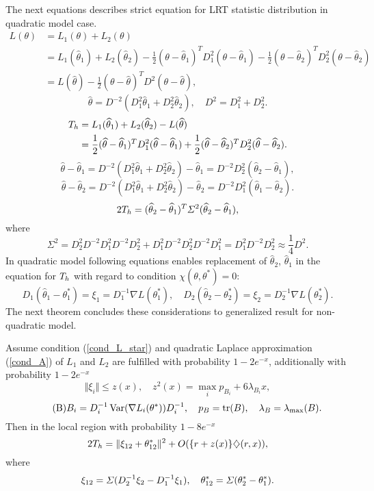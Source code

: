 The next equations describes strict equation for LRT statistic distribution in  quadratic model case. 
\begin{align*}
L(\theta) &= L_1(\theta) + L_2(\theta) \\
&=  
L_1(\widehat{\theta}_1) + L_2(\widehat{\theta}_2) -  \frac{1}{2} (\theta - \widehat{\theta}_1)^T D_1^2  (\theta - \widehat{\theta}_1)
- 
\frac{1}{2} (\theta - \widehat{\theta}_2)^T D_2^2  (\theta - \widehat{\theta}_2)  \\
 &=
 L(\widehat{\theta}) - \frac{1}{2} (\theta - \widehat{\theta})^T D^2  (\theta - \widehat{\theta}),
\end{align*}
\[
\widehat{\theta} = D^{-2} (D_1^2 \widehat{\theta}_1 + D_2^2 \widehat{\theta}_2 ),
\quad D^2 = D_1^2 + D_2^2.
\]    
\begin{align*}
T_h &=
L_1(\widehat{\theta}_1) + L_2(\widehat{\theta}_2) -  L(\widehat{\theta}) \\
&=   \frac{1}{2} (\widehat{\theta} - \widehat{\theta}_1)^T D_1^2  (\widehat{\theta} - \widehat{\theta}_1)
+ \frac{1}{2} (\widehat{\theta} - \widehat{\theta}_2)^T D_2^2  (\widehat{\theta} - \widehat{\theta}_2).
\end{align*}
\[
\widehat{\theta} - \widehat{\theta}_1 = D^{-2} (D_1^2 \widehat{\theta}_1 + D_2^2 \widehat{\theta}_2 ) - \widehat{\theta}_1 = D^{-2} D_2^2 ( \widehat{\theta}_2 -  \widehat{\theta}_1),
\]
\[
\widehat{\theta} - \widehat{\theta}_2 = D^{-2} (D_1^2 \widehat{\theta}_1 + D_2^2 \widehat{\theta}_2 ) - \widehat{\theta}_2 = D^{-2} D_1^2 ( \widehat{\theta}_1 -  \widehat{\theta}_2).
\]
\[
2 T_h =  ( \widehat{\theta}_2 -  \widehat{\theta}_1)^T \varSigma^2 ( \widehat{\theta}_2 -  \widehat{\theta}_1),
\]
where
\[\tag{S}
\Sigma^2 = D_2^2 D^{-2} D_1^2 D^{-2} D_2^2 + D_1^2 D^{-2} D_2^2 D^{-2} D_1^2
 = D_1^2 D^{-2}D_2^2 \approx \frac{1}{4} D^2. 
\]
In quadratic model  following equations enables replacement of $\widehat{\theta}_2$,  $\widehat{\theta}_1$ in the equation for $T_h$ with regard to condition $\chi(\theta, \theta^*) = 0$:
\[
 D_1(\widehat{\theta}_1 - \theta_1^*) = \xi_1 = D_1^{-1} \nabla L(\theta_1^*), \quad
D_2(\widehat{\theta}_2 - \theta_2^*) = 
\xi_2 = D_2^{-1} \nabla L(\theta_2^*).
\]
The next theorem concludes these considerations to  generalized result for non-quadratic model. 
\begin{theorem}
\label{dl_theorem}
Assume condition (\ref{cond_L_star}) and quadratic Laplace approximation (\ref{cond_A}) of $L_1$ and $L_2$   are fulfilled with probability $1 - 2 e^{-x}$, additionally with probability $1 - 2 e^{-x}$
\[
\Vert \xi_i \Vert \leq z(x), 
\quad z^2(x) = \max_i p_{B_i} + 6 \lambda_{B_i} x,
\] 
\[\tag{B}
B_i = D_i^{-1} \operatorname{Var} (\nabla L_i(\theta^*))D_i^{-1},
\quad p_B = \operatorname{tr}(B), 
\quad \lambda_B  = \lambda_{\max} (B).
\]
Then in the local region with probability $1 - 8 e^{-x}$ 
\[
2 T_h = \Vert  \xi_{12} + \theta_{12}^* \Vert^2  + O(\{r + z(x)\} \diamondsuit (r, x)),
\]
where
\[
\xi_{12}  = \varSigma (D_2^{-1} \xi_2 - D_1^{-1} \xi_1),
\quad
\theta_{12}^*  = \varSigma (\theta_2^* - \theta_1^*).
\]
\end{theorem}    

